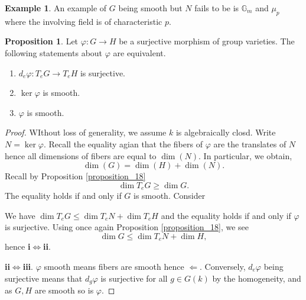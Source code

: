 \documentclass[10pt]{article}
\numberwithin{equation}{section}
\theoremstyle{definition}
\newtheorem{proposition}{Proposition}[section]
\newtheorem{example}{Example}[section]
\newcommand{\G}[0]{\mathbb{G}}
\begin{document}
\begin{example}
    An example of $G$ being smooth but $N$ fails to be is $\G_m$ and $\mu_p$ where the involving field is of characteristic $p$.
\end{example}
\begin{proposition}
    \label{proposition_25}
    Let $\varphi:G\to H$ be a surjective morphism of group varieties. The following statements about $\varphi$ are equivalent.
    \begin{enumerate}[1. ]
        \item $d_e\varphi:T_eG\to T_eH$ is surjective.
        \item $\ker\varphi$ is smooth.
        \item $\varphi$ is smooth.
    \end{enumerate}
\end{proposition}
\begin{proof}
    WIthout loss of generality, we assume $k$ is algebraically closd. Write $N=\ker \varphi$. Recall the equality agian that the fibers of $\varphi$ are the translates of $N$ hence all dimensions of fibers are equal to $\dim(N)$. In particular, we obtain,
    \begin{equation*}
        \dim(G) = \dim(H)+\dim(N).
    \end{equation*}
    Recall by Proposition \ref{proposition_18}
    \begin{equation*}
        \dim T_eG \geq \dim G.
    \end{equation*}
    The equality holds if and only if $G$ is smooth. Consider 
    \begin{center}
    \end{center} 
    We have $\dim T_eG \leq \dim T_eN+\dim T_eH$ and the equality holds if and only if $\varphi$ is surjective. Using once again Proposition \ref{proposition_18}, we see 
    \begin{equation*}
        \dim G\leq \dim T_eN+\dim H,
    \end{equation*}
    hence \textbf{i}$\iff$\textbf{ii}. 
    \par \textbf{ii}$\iff$\textbf{iii}. $\varphi$ smooth means fibers are smooth hence $\Leftarrow$. Conversely, $d_e\varphi$ being surjective means that $d_g\varphi$ is surjective for all $g\in G(k)$ by the homogeneity, and as $G,H$ are smooth so is $\varphi$.
\end{proof}
\end{document}
